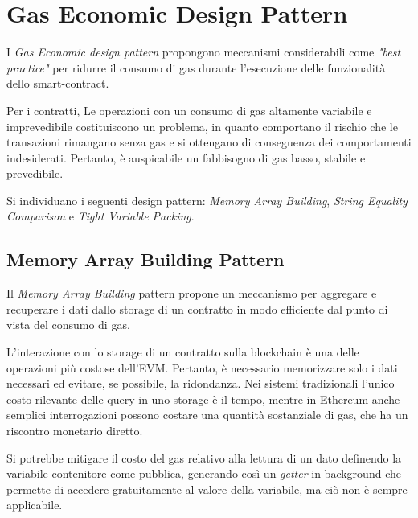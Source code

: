 {\section{Gas Economic Design Pattern}
	I \textit{Gas Economic design pattern} propongono meccanismi considerabili come \textit{"best practice"} per ridurre il consumo di gas durante l'esecuzione delle funzionalità dello smart-contract. \par
	Per i contratti, Le operazioni con un consumo di gas altamente variabile e imprevedibile costituiscono un problema, in quanto comportano il rischio che le transazioni rimangano senza gas e si ottengano di conseguenza dei comportamenti indesiderati. Pertanto, è auspicabile un fabbisogno di gas basso, stabile e prevedibile.\par
	Si individuano i seguenti design pattern: \textit{Memory Array Building}, \textit{String Equality Comparison} e \textit{Tight Variable Packing}.
	\newpage
	{\subsection{Memory Array Building Pattern}
		Il \textit{Memory Array Building} pattern propone un meccanismo per aggregare e recuperare i dati dallo storage di un contratto in modo efficiente dal punto di vista del consumo di gas.\par	L'interazione con lo storage di un contratto sulla blockchain è una delle operazioni più costose dell'EVM. Pertanto, è necessario memorizzare solo i dati necessari ed evitare, se possibile, la ridondanza. Nei sistemi tradizionali l'unico costo rilevante delle query in uno storage è il tempo, mentre in Ethereum anche semplici interrogazioni possono costare una quantità sostanziale di gas, che ha un riscontro monetario diretto.\par
		Si potrebbe mitigare il costo del gas relativo alla lettura di un dato definendo la variabile contenitore come pubblica, generando così un \textit{getter} in background che permette di accedere gratuitamente al valore della variabile, ma ciò non è sempre applicabile.
		\begin{table}[H]
			\centering
\end{table}}}
